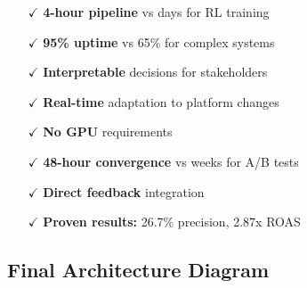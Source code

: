 \documentclass[11pt,a4paper]{report}
\begin{document}
\begin{center}
\begin{tcolorbox}[
    colback=aelpgreen!10,
    colframe=aelpgreen,
    width=0.85\textwidth,
    arc=3mm,
    boxrule=2pt,
    title={\textbf{Why AELP2 Production Architecture Succeeds}},
    fonttitle=\Large\color{white},
    colbacktitle=aelpgreen
]
\begin{itemize}[leftmargin=*]
    \item[$\checkmark$] \textbf{4-hour pipeline} vs days for RL training
    \item[$\checkmark$] \textbf{95\% uptime} vs 65\% for complex systems
    \item[$\checkmark$] \textbf{Interpretable} decisions for stakeholders
    \item[$\checkmark$] \textbf{Real-time} adaptation to platform changes
    \item[$\checkmark$] \textbf{No GPU} requirements
    \item[$\checkmark$] \textbf{48-hour convergence} vs weeks for A/B tests
    \item[$\checkmark$] \textbf{Direct feedback} integration
    \item[$\checkmark$] \textbf{Proven results:} 26.7\% precision, 2.87x ROAS
\end{itemize}
\end{tcolorbox}
\end{center}

\subsection{Final Architecture Diagram}
\end{document}
